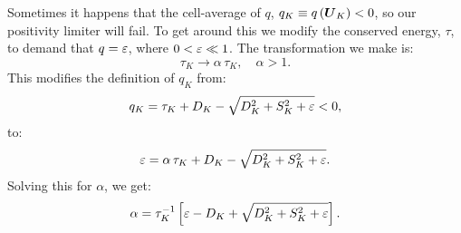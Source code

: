 Sometimes it happens that the cell-average of $q$, $q_{K}\equiv q\left(\boldsymbol{U}_{K}\right)<0$, so our positivity limiter will fail. To get around this we modify the conserved energy, $\tau$, to demand that $q=\varepsilon$, where $0<\varepsilon\ll1$. The transformation we make is:
\begin{equation}
   \tau_{K}\longrightarrow\alpha\,\tau_{K},\hspace{1em}\alpha>1.
\end{equation}
This modifies the definition of $q_{K}$ from:
\begin{equation}
   q_{K}=\tau_{K}+D_{K}-\sqrt{D_{K}^{2}+S_{K}^{2}+\varepsilon}<0,
\end{equation}
to:
\begin{equation}
   \varepsilon=\alpha\,\tau_{K}+D_{K}-\sqrt{D_{K}^{2}+S_{K}^{2}+\varepsilon}.
\end{equation}
Solving this for $\alpha$, we get:
\begin{equation}
   \alpha=\tau_{K}^{-1}\left[\varepsilon-D_{K}+\sqrt{D_{K}^{2}+S_{K}^{2}+\varepsilon}\right].
\end{equation}

